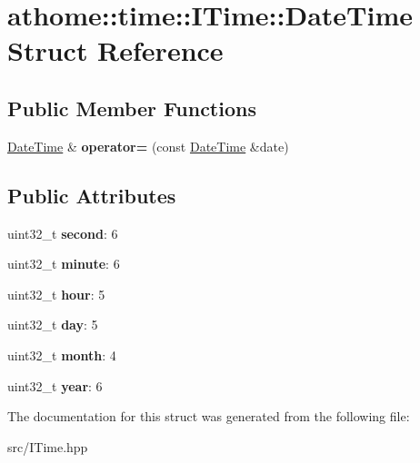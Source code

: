 \hypertarget{structathome_1_1time_1_1_i_time_1_1_date_time}{}\section{athome\+:\+:time\+:\+:I\+Time\+:\+:Date\+Time Struct Reference}
\label{structathome_1_1time_1_1_i_time_1_1_date_time}
\subsection*{Public Member Functions}
\begin{DoxyCompactItemize}
\item 
\mbox{\label{structathome_1_1time_1_1_i_time_1_1_date_time_a0380ffd91df34e5f59f7e24a0d31690e}} 
\mbox{\hyperlink{structathome_1_1time_1_1_i_time_1_1_date_time}{Date\+Time}} \& {\bfseries operator=} (const \mbox{\hyperlink{structathome_1_1time_1_1_i_time_1_1_date_time}{Date\+Time}} \&date)
\end{DoxyCompactItemize}
\subsection*{Public Attributes}
\begin{DoxyCompactItemize}
\item 
\mbox{\label{structathome_1_1time_1_1_i_time_1_1_date_time_aa8d293191e225992f76d54a20bf20c4c}} 
uint32\+\_\+t {\bfseries second}\+: 6
\item 
\mbox{\label{structathome_1_1time_1_1_i_time_1_1_date_time_aeaf95ec7b94f3515f1351ace98abacde}} 
uint32\+\_\+t {\bfseries minute}\+: 6
\item 
\mbox{\label{structathome_1_1time_1_1_i_time_1_1_date_time_a3ca068c42464b2aedf8ad38fbf04a706}} 
uint32\+\_\+t {\bfseries hour}\+: 5
\item 
\mbox{\label{structathome_1_1time_1_1_i_time_1_1_date_time_a2c1e84fc382eba06a6271f66c2f7ca0b}} 
uint32\+\_\+t {\bfseries day}\+: 5
\item 
\mbox{\label{structathome_1_1time_1_1_i_time_1_1_date_time_a2bf001a7e2b93e0b0077dca04ef8a60d}} 
uint32\+\_\+t {\bfseries month}\+: 4
\item 
\mbox{\label{structathome_1_1time_1_1_i_time_1_1_date_time_a7331035799fc6b1c66c61cbbcbfbeb1e}} 
uint32\+\_\+t {\bfseries year}\+: 6
\end{DoxyCompactItemize}


The documentation for this struct was generated from the following file\+:\begin{DoxyCompactItemize}
\item 
src/I\+Time.\+hpp\end{DoxyCompactItemize}
